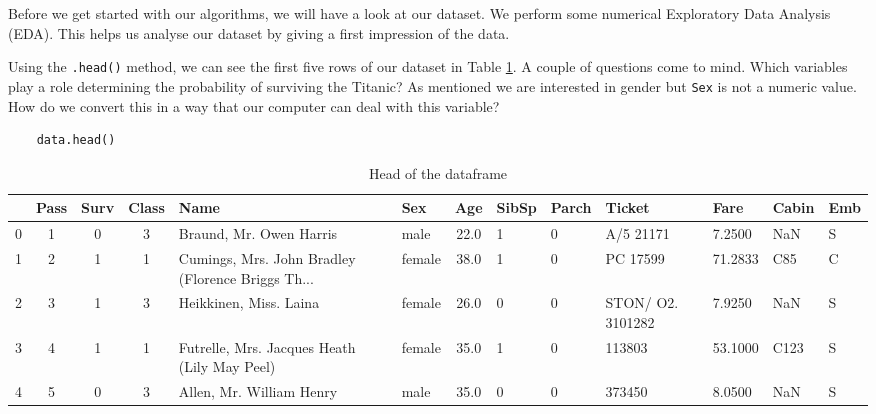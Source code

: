 \documentclass[11pt]{article}
\begin{document}
Before we get started with our algorithms, we will have a look at our dataset. We perform some numerical Exploratory Data Analysis (EDA). This helps us analyse our dataset by giving a first impression of the data. 

Using the \texttt{.head()} method, we can see the first five rows of our dataset in Table \ref{tab:table1}. A couple of questions come to
mind. Which variables play a role determining the probability of surviving the Titanic? As mentioned we are interested in gender but \texttt{Sex} is not a numeric value. How do we convert this in a way that our computer can deal with this variable? 

\begin{verbatim}
    data.head()
\end{verbatim}

\begin{table}
\small
\begin{center}
\caption{\label{tab:table1}Head of the dataframe}
\begin{adjustwidth}{-2cm}{}
\begin{tabular}{|l|c|c|c|p{3cm}|l|c|p{1cm}|p{1cm}|p{1cm}|p{1cm}|l|p{0.5cm}|}
\toprule
\hline
{} &  Pass &  Surv &  Class &                                               Name &     Sex &   Age &  SibSp &  Parch &            Ticket &     Fare & Cabin & Emb \\
\midrule
\hline
 0 &            1 &         0 &       3 &                            Braund, Mr. Owen Harris &    male &  22.0 &      1 &      0 &         A/5 21171 &   7.2500 &   NaN &        S \\
 1 &            2 &         1 &       1 &  Cumings, Mrs. John Bradley (Florence Briggs Th... &  female &  38.0 &      1 &      0 &          PC 17599 &  71.2833 &   C85 &        C \\
 2 &            3 &         1 &       3 &                             Heikkinen, Miss. Laina &  female &  26.0 &      0 &      0 &  STON/ O2. 3101282 &   7.9250 &   NaN &        S \\
 3 &            4 &         1 &       1 &       Futrelle, Mrs. Jacques Heath (Lily May Peel) &  female &  35.0 &      1 &      0 &            113803 &  53.1000 &  C123 &        S \\
 4 &            5 &         0 &       3 &                           Allen, Mr. William Henry &    male &  35.0 &      0 &      0 &            373450 &   8.0500 &   NaN &        S \\
\bottomrule
\hline
\end{tabular}
\end{adjustwidth}
\end{center}
\end{table}
\end{document}
